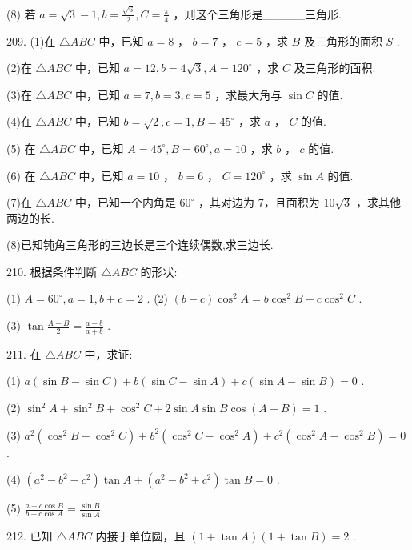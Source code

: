 \documentclass[10pt]{article}
\begin{document}
(8) 若 \(a = \sqrt{3} - 1,b = \frac{\sqrt{6}}{2},C = \frac{\pi }{4}\) ，则这个三角形是\_\_\_\_\_三角形.

209. (1)在 \(\bigtriangleup  {ABC}\) 中，已知 \(a = 8\) ， \(b = 7\) ， \(c = 5\) ，求 \(B\) 及三角形的面积 \(S\) .

(2)在 \(\bigtriangleup  {ABC}\) 中，已知 \(a = {12},b = 4\sqrt{3},A = {120}^{ \circ  }\) ，求 \(C\) 及三角形的面积.

(3)在 \(\bigtriangleup  {ABC}\) 中，已知 \(a = 7,b = 3,c = 5\) ，求最大角与 \(\sin C\) 的值.

(4)在 \(\bigtriangleup  {ABC}\) 中，已知 \(b = \sqrt{2},c = 1,B = {45}^{ \circ  }\) ，求 \(a\) ， \(C\) 的值.

(5) 在 \(\bigtriangleup  {ABC}\) 中，已知 \({A = {45}^{ \circ  }},{B = {60}^{ \circ  }},{a = {10}}\) ，求 \(b\) ， \(c\) 的值.

(6) 在 \(\bigtriangleup  {ABC}\) 中，已知 \(a = {10}\) ， \(b = 6\) ， \(C = {120}^{ \circ  }\) ，求 \(\sin A\) 的值.

(7)在 \(\bigtriangleup  {ABC}\) 中，已知一个内角是 \({60}^{ \circ  }\) ，其对边为 7，且面积为 \({10}\sqrt{3}\) ，求其他两边的长.

(8)已知钝角三角形的三边长是三个连续偶数,求三边长.

210. 根据条件判断 \(\bigtriangleup {ABC}\) 的形状:

(1) \(A = {60}^{ \circ  },a = 1,b + c = 2\) . (2) \(\left( {b - c}\right) {\cos }^{2}A = b{\cos }^{2}B - c{\cos }^{2}C\) .

(3) \(\tan \frac{A - B}{2} = \frac{a - b}{a + b}\) .

211. 在 \(\bigtriangleup  {ABC}\) 中，求证:

(1) \(a\left( {\sin B - \sin C}\right)  + b\left( {\sin C - \sin A}\right)  + c\left( {\sin A - \sin B}\right)  = 0\) .

(2) \({\sin }^{2}A + {\sin }^{2}B + {\cos }^{2}C + 2\sin A\sin B\cos \left( {A + B}\right)  = 1\) .

(3) \({a}^{2}\left( {{\cos }^{2}B - {\cos }^{2}C}\right)  + {b}^{2}\left( {{\cos }^{2}C - {\cos }^{2}A}\right)  + {c}^{2}\left( {{\cos }^{2}A - {\cos }^{2}B}\right)  = 0\) .

(4) \(\left( {{a}^{2} - {b}^{2} - {c}^{2}}\right) \tan A + \left( {{a}^{2} - {b}^{2} + {c}^{2}}\right) \tan B = 0\) .

(5) \(\frac{a - c\cos B}{b - c\cos A} = \frac{\sin B}{\sin A}\) .

212. 已知 \(\bigtriangleup  {ABC}\) 内接于单位圆，且 \(\left( {1 + \tan A}\right) \left( {1 + \tan B}\right)  = 2\) .
\end{document}
